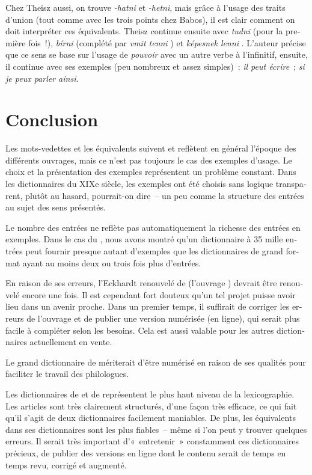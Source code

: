 \documentclass[output=paper,colorlinks,citecolor=brown,arabicfont,chinesefont,booklanguage=french]{langscibook}
\begin{document}
\begin{otherlanguage}{french}
Chez Theisz aussi, on trouve \emph{-hatni} et \emph{-hetni}, mais grâce à l’usage des traits d’union (tout comme avec les trois points chez Babos), il est clair comment on doit interpréter ces équivalents. Theisz continue ensuite avec \emph{tudni} (pour la première fois~!), \emph{bírni} (complété par \emph{vmit tenni} ) et \emph{képesnek lenni} . L’auteur précise que ce sens se base sur l’usage de \emph{pouvoir} avec un autre verbe à l’infinitif, ensuite, il continue avec ses exemples (peu nombreux et assez simples)~: \emph{il peut écrire}~; \emph{si je peux parler ainsi}.

\section{Conclusion}\label{sec:tillinger:4}

Les mots-vedettes et les équivalents suivent et reflètent en général l’époque des différents ouvrages, mais ce n’est pas toujours le cas des exemples d’usage. Le choix et la présentation des exemples représentent un problème constant. Dans les dictionnaires du XIXe siècle, les exemples ont été choisis sans logique transparent, plutôt au hasard, pourrait-on dire~-- un peu comme la structure des entrées au sujet des sens présentés.

Le nombre des entrées ne reflète pas automatiquement la richesse des entrées en exemples. Dans le cas du \citeauthor{Palfy1999}, nous avons montré qu’un dictionnaire à 35 mille entrées peut fournir presque autant d’exemples que les dictionnaires de grand format ayant au moins deux ou trois fois plus d’entrées. 

En raison de ses erreurs, l’Eckhardt renouvelé de \citeyear{EckhardtOlah1999} (l’ouvrage \citeauthor{EckhardtOlah1999}) devrait être renouvelé encore une fois. Il est cependant fort douteux qu'un tel projet puisse avoir lieu dans un avenir proche. Dans un premier temps, il suffirait de corriger les erreurs de l’ouvrage et de publier une version numérisée (en ligne), qui serait plus facile à compléter selon les besoins. Cela est aussi valable pour les autres dictionnaires actuellement en vente.

Le grand dictionnaire de \citeauthor{Sauvageot1932} mériterait d’être numérisé en raison de ses qualités pour faciliter le travail des philologues. 

Les dictionnaires de \citeauthor{Palfy1999} et de \citeauthor{BardosiSzabo2007} représentent le plus haut niveau de la lexicographie. Les articles sont très clairement structurés, d’une façon très efficace, ce qui fait qu’il s’agit de deux dictionnaires facilement maniables. De plus, les équivalents dans ses dictionnaires sont les plus fiables~– même si l’on peut y trouver quelques erreurs. Il serait très important d’«~entretenir~» constamment ces dictionnaires précieux, de publier des versions en ligne dont le contenu serait de temps en temps revu, corrigé et augmenté.

{\sloppy\printbibliography[heading=subbibliography,notkeyword=this]}
\end{otherlanguage}

\renewcommand{\tabref}[1]{Table~\ref{#1}}
\end{document}
